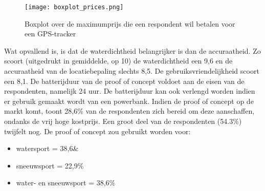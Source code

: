 \begin{figure}
	\texttt{[image: boxplot\_prices.png]}
	\caption[Boxplot maximum prijs]{Boxplot over de maximumprijs die een respondent wil betalen voor een GPS-tracker}
	\label{graph:price}
\end{figure}
\newline
Wat opvallend is, is dat de waterdichtheid belangrijker is dan de accuraatheid. Zo scoort (uitgedrukt in gemiddelde, op 10) de waterdichtheid een 9,6 en de accuraatheid van de locatiebepaling slechts 8,5. De gebruiksvriendelijkheid scoort een 8,1. 
\newline
De batterijduur van de proof of concept voldoet aan de eisen van de respondenten, namelijk 24 uur. De batterijduur kan ook verlengd worden indien er gebruik gemaakt wordt van een powerbank.
\newline
Indien de proof of concept op de markt komt, toont 28,6\% van de respondenten zich bereid om deze aanschaffen, ondanks de vrij hoge kostprijs. Een groot deel van de respondenten (54.3\%) twijfelt nog. 
\newline
De proof of concept zou gebruikt worden voor:
\begin{itemize}
	\item watersport = 38,6\&
	\item sneeuwsport = 22,9\%
	\item water- en sneeuwsport = 38,6\%
\end{itemize}
\pagebreak
